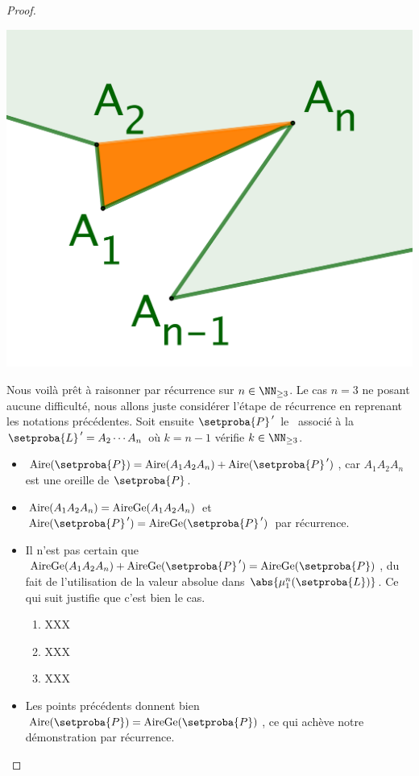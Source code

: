 \begin{proof}
    
    \begin{center}
        \includegraphics[scale=.4]{content/polygon/sufficient-cond/triangulation-proof.png}
    \end{center}
    
    
    Nous voilà prêt à raisonner par récurrence sur $n \in \NN_{\geq3}$.
    Le cas $n = 3$ ne posant aucune difficulté, nous allons juste considérer l'étape de récurrence en reprenant les notations précédentes.
    Soit ensuite
    $\setproba{P}^{\,\prime}$ le \kgone\ associé à la \kline\ $\setproba{L}^{\,\prime} = A_2 \cdots A_n$ où $k = n-1$ vérifie $k \in \NN_{\geq3}$.
    
    \begin{itemize}
    	\item $\area{\setproba{P}} = \area{A_1 A_2 A_n}  +  \area{\setproba{P}^{\,\prime}}$, 
		car $A_1 A_2 A_n$ est une oreille de $\setproba{P}$.

    	\item $\mathrm{Aire}(A_1 A_2 A_n) = \mathrm{AireGe}(A_1 A_2 A_n)$ et $\area{\setproba{P}^{\,\prime}} = \garea{\setproba{P}^{\,\prime}}$ 
		par récurrence.

    	\item Il n'est pas certain que $\garea{A_1 A_2 A_n} + \garea{\setproba{P}^{\,\prime}} = \garea{\setproba{P}}$,
	du fait de l'utilisation de la valeur absolue dans $\abs{\mu_1^n (\setproba{L})}$.
	Ce qui suit justifie que c'est bien le cas.
		\begin{enumerate}
			\item XXX

			\item XXX

			\item XXX
		\end{enumerate}

    	\item Les points précédents donnent bien $\area{\setproba{P}} = \garea{\setproba{P}}$, ce qui achève notre démonstration par récurrence.
    \end{itemize}
\end{proof}


